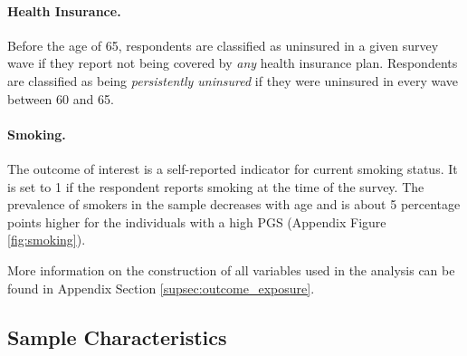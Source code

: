 \documentclass[11pt]{article}
\begin{document}
\paragraph{Health Insurance.}
Before the age of 65, respondents are classified as uninsured in a given survey wave if they report not being covered by \textit{any} health insurance plan.
Respondents are classified as being \textit{persistently uninsured} if they were uninsured in every wave between 60 and 65.



\paragraph{Smoking.} The outcome of interest is a self-reported indicator for current smoking status.
It is set to 1 if the respondent reports smoking at the time of the survey.
The prevalence of smokers in the sample decreases with age and is about 5 percentage points higher for the individuals with a high PGS (Appendix Figure \ref{fig:smoking}).

More information on the construction of all variables used in the analysis can be found in Appendix Section \ref{supsec:outcome_exposure}.


\subsection{Sample Characteristics}\label{sec:sumstats}
\end{document}
